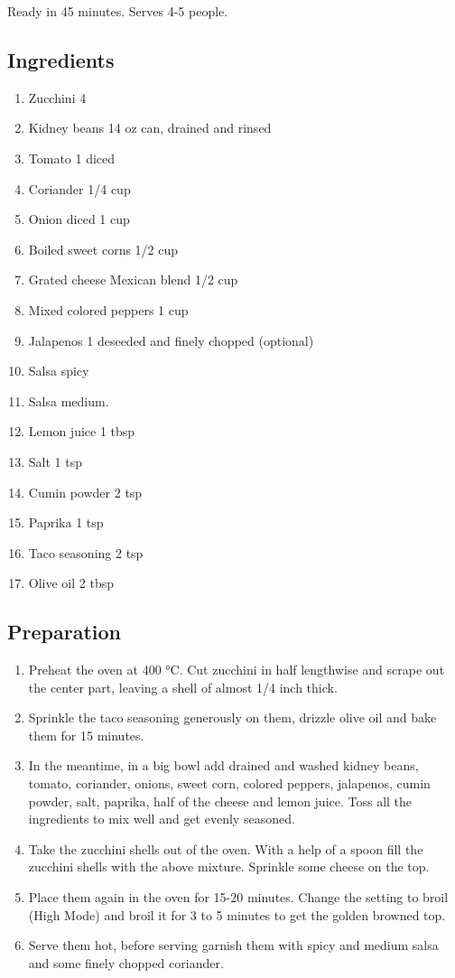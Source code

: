 \documentclass[
  oneside]{book}
\begin{document}
Ready in 45 minutes. Serves 4-5 people.

\hypertarget{ingredients-4}{%
\subsection{Ingredients}\label{ingredients-4}}

\begin{enumerate}
\def\labelenumi{\arabic{enumi}.}
\item
  Zucchini 4
\item
  Kidney beans 14 oz can, drained and rinsed
\item
  Tomato 1 diced
\item
  Coriander 1/4 cup
\item
  Onion diced 1 cup
\item
  Boiled sweet corns 1/2 cup
\item
  Grated cheese Mexican blend 1/2 cup
\item
  Mixed colored peppers 1 cup
\item
  Jalapenos 1 deseeded and finely chopped (optional)
\item
  Salsa spicy
\item
  Salsa medium.
\item
  Lemon juice 1 tbsp
\item
  Salt 1 tsp
\item
  Cumin powder 2 tsp
\item
  Paprika 1 tsp
\item
  Taco seasoning 2 tsp
\item
  Olive oil 2 tbsp
\end{enumerate}

\hypertarget{preparation-4}{%
\subsection{Preparation}\label{preparation-4}}

\begin{enumerate}
\def\labelenumi{\arabic{enumi}.}
\item
  Preheat the oven at 400 °C. Cut zucchini in half lengthwise and scrape out the center part, leaving a shell of almost 1/4 inch thick.
\item
  Sprinkle the taco seasoning generously on them, drizzle olive oil and bake them for 15 minutes.
\item
  In the meantime, in a big bowl add drained and washed kidney beans, tomato, coriander, onions, sweet corn, colored peppers, jalapenos, cumin powder, salt, paprika, half of the cheese and lemon juice. Toss all the ingredients to mix well and get evenly seasoned.
\item
  Take the zucchini shells out of the oven. With a help of a spoon fill the zucchini shells with the above mixture. Sprinkle some cheese on the top.
\item
  Place them again in the oven for 15-20 minutes. Change the setting to broil (High Mode) and broil it for 3 to 5 minutes to get the golden browned top.
\item
  Serve them hot, before serving garnish them with spicy and medium salsa and some finely chopped coriander.
\end{enumerate}
\end{document}
